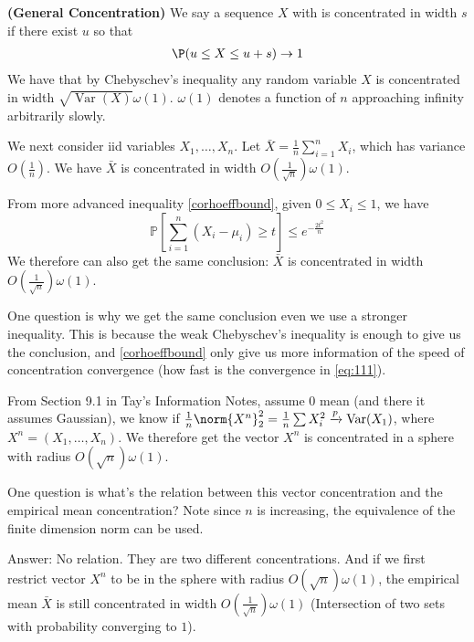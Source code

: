 \documentclass{article}
\newcommand{\bfs}[1]{\textbf{({#1})}}
\begin{document}
\begin{rema}{\bfs{General Concentration}}
We say a sequence $X$ with is concentrated in width $s$ if there exist $u$ so that
\begin{align}
    \P(u \leq X \leq u+s) \to 1\label{eq:111}
\end{align}
We have that by Chebyschev's inequality any random variable $X$ is 
concentrated in width $\sqrt{\operatorname{Var}(X)} \omega(1) .$ $\omega(1)$ denotes a function of $n$ approaching infinity arbitrarily slowly.

We next consider \gls{iid} variables $X_1,\ldots,X_n$. Let $\bar{X} = \frac{1}{n}\sum_{i=1}^{n}X_i$, which has variance $O(\frac{1}{n})$. We have $\bar{X}$ is concentrated in width $O(\frac{1}{\sqrt{n}})\omega(1)$.

From more advanced inequality \cref{corhoeffbound}, given $0\le X_i\le 1$, we have
$$
\mathbb{P}\left[\sum_{i=1}^{n}\left(X_{i}-\mu_{i}\right) \geq t\right] \leq e^{-\frac{2 t^{2}}{n}}
$$
We therefore can also get the same conclusion: $\bar{X}$ is concentrated in width $O(\frac{1}{\sqrt{n}})\omega(1)$. 

One question is why we get the same conclusion even we use a stronger inequality. This is because the weak Chebyschev's inequality is enough to give us the conclusion, and  \cref{corhoeffbound} only give us more information of the speed of concentration convergence (how fast is the convergence in \cref{eq:111}).


From Section 9.1 in Tay's Information Notes, assume $0$ mean (and there it assumes Gaussian), we know if $\frac{1}{n}\norm{X^n}_2^2 =\frac{1}{n}\sum X_i^2\xrightarrow{p} \operatorname{Var}(X_1) $, where $X^n=(X_1,\ldots,X_n)$. We therefore get the vector $X^n$ is concentrated in a sphere with radius $O(\sqrt{n})\omega(1)$.

One question is what's the relation between this vector concentration and the empirical mean concentration? Note since $n$ is increasing, the equivalence of the finite dimension norm can be used.

Answer: No relation. They are two different concentrations. And if we first restrict vector $X^n$ to be in the sphere with radius $O(\sqrt{n})\omega(1)$, the empirical mean $\bar{X}$ is still concentrated in width $O(\frac{1}{\sqrt{n}})\omega(1)$ (Intersection of two sets with probability converging to $1$). 
\end{rema}
\end{document}

